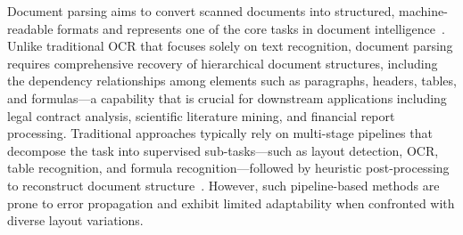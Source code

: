 







Document parsing aims to convert scanned documents into structured, machine-readable formats and represents one of the core tasks in document intelligence~\citep{DocumentParsing1,MinerU,got2,xia2024docgenome,zhang2024document}. Unlike traditional OCR that focuses solely on text recognition, document parsing requires comprehensive recovery of hierarchical document structures, including the dependency relationships among elements such as paragraphs, headers, tables, and formulas—a capability that is crucial for downstream applications including legal contract analysis, scientific literature mining, and financial report processing. Traditional approaches typically rely on multi-stage pipelines that decompose the task into supervised sub-tasks—such as layout detection, OCR, table recognition, and formula recognition—followed by heuristic post-processing to reconstruct document structure~\citep{Nougat,Vary,fox,got2,Qwen-VL,InternVL}. However, such pipeline-based methods are prone to error propagation and exhibit limited adaptability when confronted with diverse layout variations.




